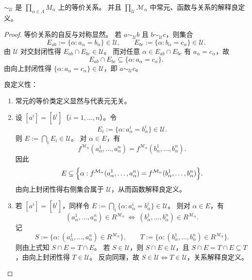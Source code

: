\documentclass[lang=cn,a4paper,newtx,section]{elegantbook}
\begin{document}
\begin{lemma}
\label{ultraproduct-well-defined}
$\sim_{\mathcal U}$ 是 $\prod_{\alpha\in\Lambda}M_{\alpha}$ 上的等价关系。
并且 $\prod_{\mathcal U}\mathcal M_{\alpha}$ 中常元、函数与关系的解释良定义。
\end{lemma}

\begin{proof}
等价关系的自反与对称显然。
若 $a\sim_{\mathcal U} b$ 且 $b\sim_{\mathcal U} c$，则集合
\[
E_{ab}:=\{\alpha:a_{\alpha}=b_{\alpha}\}\in\mathcal U,\qquad E_{bc}:=\{\alpha:b_{\alpha}=c_{\alpha}\}\in\mathcal U.
\]
由 $\mathcal U$ 对交封闭性得 $E_{ab}\cap E_{bc}\in\mathcal U$。
而对任意 $\alpha\in E_{ab}\cap E_{bc}$ 有 $a_{\alpha}=c_{\alpha}$，故
\[
E_{ab}\cap E_{bc}\subseteq\{\alpha:a_{\alpha}=c_{\alpha}\}.
\]
由向上封闭性得 $\{\alpha:a_{\alpha}=c_{\alpha}\}\in\mathcal U$，即 $a\sim_{\mathcal U} c$。

良定义性：
\begin{enumerate}
\item 常元的等价类定义显然与代表元无关。
\item 设 $[a^{i}]=[b^{i}]$（$i=1,\dots,n$）。令
\[
E_i:=\{\alpha:a^{i}_{\alpha}=b^{i}_{\alpha}\}\in\mathcal U.
\]
则 $E:=\bigcap_i E_i\in\mathcal U$。
对 $\alpha\in E$，有
\[
f^{\mathcal M_{\alpha}}(a^{1}_{\alpha},\dots,a^{n}_{\alpha})=f^{\mathcal M_{\alpha}}(b^{1}_{\alpha},\dots,b^{n}_{\alpha}).
\]
因此
\[
E\subseteq\Bigl\{\alpha: f^{\mathcal M_{\alpha}}(a^{1}_{\alpha},\dots,a^{n}_{\alpha})=f^{\mathcal M_{\alpha}}(b^{1}_{\alpha},\dots,b^{n}_{\alpha})\Bigr\}.
\]
由向上封闭性得右侧集合属于 $\mathcal U$，从而函数解释良定义。
\item 若 $[a^{i}]=[b^{i}]$，同样令 $E:=\bigcap_i\{\alpha:a^{i}_{\alpha}=b^{i}_{\alpha}\}\in\mathcal U$。
则对 $\alpha\in E$，有
\[
(a^{1}_{\alpha},\dots,a^{n}_{\alpha})\in R^{\mathcal M_{\alpha}}\ \Longleftrightarrow\ (b^{1}_{\alpha},\dots,b^{n}_{\alpha})\in R^{\mathcal M_{\alpha}}.
\]
 记
\[
S:=\{\alpha:(a^{1}_{\alpha},\dots,a^{n}_{\alpha})\in R^{\mathcal M_{\alpha}}\},\qquad T:=\{\alpha:(b^{1}_{\alpha},\dots,b^{n}_{\alpha})\in R^{\mathcal M_{\alpha}}\}.
\]
则由上式知 $S\cap E=T\cap E$。
若 $S\in\mathcal U$，则 $S\cap E\in\mathcal U$，且 $S\cap E=T\cap E\subseteq T$，由向上封闭性得 $T\in\mathcal U$。
反向同理，故 $S\in\mathcal U\Longleftrightarrow T\in\mathcal U$，关系解释良定义。
 \end{enumerate}
 \end{proof}
\end{document}
